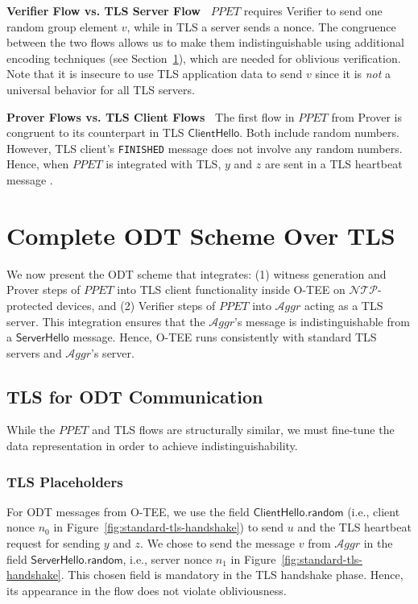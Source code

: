 \documentclass[letterpaper,twocolumn,10pt]{article}
\newcommand{\T}{\ensuremath{\mathcal{A}ggr}\xspace}
\newcommand{\N}{\ensuremath{\mathcal{N\!T}\mathcal{\!P}}\xspace}
\newcommand{\mypara}[1]{\vspace{.5em}\noindent\textbf{{#1}~}}
\begin{document}
\mypara{Verifier Flow vs. TLS Server Flow}
$\mathit{PPET}$ requires Verifier to send one random group element $v$, while in TLS a server sends a nonce.
The congruence between the two flows allows us to make them indistinguishable using additional encoding
techniques (see Section~\ref{sec:integration}), which are needed for oblivious verification. Note that
it is insecure to use TLS application data to send $v$ since it is \emph{not} a universal behavior
for all TLS servers.

\mypara{Prover Flows vs. TLS Client Flows} The first flow in $\mathit{PPET}$ from Prover is congruent to
its counterpart in TLS $\mathsf{ClientHello}$. Both include random numbers. However, TLS client's \texttt{FINISHED}
message does not involve any random numbers. Hence, when $\mathit{PPET}$ is integrated with TLS, $y$ and $z$ are sent
in a TLS heartbeat message \cite{TLS13}.


\section{Complete ODT Scheme Over TLS}
\label{sec:integration}
%
We now present the ODT scheme that integrates: (1) witness generation and Prover steps of $\mathit{PPET}$ into
TLS client functionality inside O-TEE on \N-protected devices, and (2) Verifier steps of $\mathit{PPET}$ into \T
acting as a TLS server. This integration ensures that the \T's message is indistinguishable from a $\mathsf{ServerHello}$
message.  Hence, O-TEE runs consistently with standard TLS servers and \T's server.

\subsection{TLS for ODT Communication}
\label{sec:covert}
While the $\mathit{PPET}$ and TLS flows are structurally similar, we must fine-tune
the data representation in order to achieve indistinguishability.

\subsubsection{TLS Placeholders}
%
For ODT messages from O-TEE, we use the field $\mathsf{ClientHello.random}$ (i.e., client nonce $n_0$ in
Figure~\ref{fig:standard-tls-handshake}) to send $u$ and the TLS heartbeat request for sending
$y$ and $z$. We chose to send the message $v$ from \T in the field $\mathsf{ServerHello.random}$,
i.e., server nonce $n_1$ in Figure~\ref{fig:standard-tls-handshake}. This chosen field is mandatory
in the TLS handshake phase. Hence, its appearance in the flow does not violate obliviousness.
\end{document}
